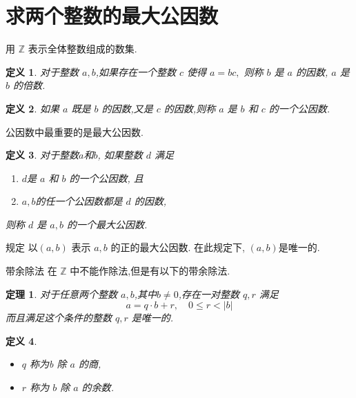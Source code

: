 \documentclass[10pt,punct]{ctexbeamer}
\newtheorem{thm}{定理}
\newtheorem*{defi}{定义}
\begin{document}
\section{求两个整数的最大公因数}
\begin{frame}

    用 $\mathbb{Z}$ 表示全体整数组成的数集.



    \begin{defi}
        对于整数 $a ,b$,如果存在一个整数 $c$ 使得 $a=b c,$ 则称
        $b$ 是 $a$ 的\alert{因数}, $a$ 是 $b$ 的\alert{倍数}.
    \end{defi}

    \begin{defi}
        如果 $a$ 既是 $b$ 的因数,又是 $c$ 的因数,则称 $a$ 是 $b$ 和 $c$ 的一个\alert{公因数}.
    \end{defi}
    公因数中最重要的是最大公因数.

\begin{defi}
    对于整数$a$和$b$, 如果整数 $d$ 满足
    \begin{enumerate}
        \item $d$是 $a$ 和 $b$ 的一个公因数, 且
        \item $a, b $的任一个公因数都是 $d$ 的因数,
    \end{enumerate}
    则称 $d$ 是 $a, b$ 的一个\alert{最大公因数}.
\end{defi}


    规定 以$(a, b)$ 表示 $a, b$ 的正的最大公因数. 在此规定下, $(a, b)$是唯一的.


\end{frame}


\begin{frame}{带余除法}
    在 $\mathbb{Z}$ 中不能作除法,但是有以下的\alert{带余除法}.
    \begin{thm}
        对于任意两个整数 $a ,b$,其中$b\neq 0$,存在一对整数 $q, r$ 满足
        \[
        a=q \cdot b+r, \quad 0 \leqslant r<|b|
        \]
        而且满足这个条件的整数 $q, r$ 是唯一的.
    \end{thm}

    \begin{defi}
        \begin{itemize}
            \item $q$ 称为b 除 $a$ 的\alert{商},
            \item $r$ 称为 $b$ 除 $a$ 的\alert{余数}.
        \end{itemize}
    \end{defi}

\end{frame}
\end{document}
